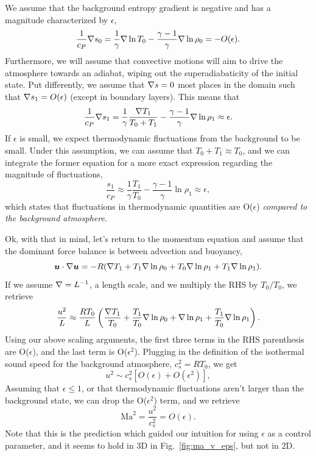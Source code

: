 We assume that the background entropy gradient is negative and has a magnitude characterized by $\epsilon$,
$$
\frac{1}{c_P}\nabla s_0 = \frac{1}{\gamma}\nabla\ln T_0 - \frac{\gamma - 1}{\gamma}\nabla \ln \rho_0 = -O(\epsilon).
$$
Furthermore, we will assume that convective motions will aim to drive the atmosphere towards an adiabat, wiping out the superadiabaticity of the initial state.
Put differently, we assume that $\nabla s = 0$ most places in the domain such that $\nabla s_1 = O(\epsilon)$ (except in boundary layers).
This means that
$$
\frac{1}{c_P}\nabla s_1 = \frac{1}{\gamma}\frac{\nabla T_1}{T_0 + T_1} - \frac{\gamma - 1}{\gamma}\nabla\ln\rho_1 \approx \epsilon.
$$
If $\epsilon$ is small, we expect thermodynamic fluctuations from the background to be small.
Under this assumption, we can assume that $T_0 + T_1 \approx T_0$, and we can integrate the former equation for a more exact expression regarding the magnitude of fluctuations,
\begin{equation}
\frac{s_1}{c_P} \approx \frac{1}{\gamma}\frac{T_1}{T_0} - \frac{\gamma-1}{\gamma}\ln\rho_1 \approx \epsilon,
\end{equation}
which states that fluctuations in thermodynamic quantities are O($\epsilon$) \emph{compared to the background atmosphere}.

Ok, with that in mind, let's return to the momentum equation and assume that the dominant force balance is between advection and buoyancy,
$$
\bm{u}\cdot\nabla\bm{u} = - R(\nabla T_1 + T_1 \nabla\ln\rho_0 + T_0 \nabla\ln\rho_1 + T_1 \nabla\ln\rho_1).
$$
If we assume $\nabla = L^{-1}$, a length scale, and we multiply the RHS by $T_0 / T_0$, we retrieve
$$
\frac{u^2}{L} \approx \frac{R T_0}{L}\left(\frac{\nabla T_1}{T_0} + \frac{T_1}{T_0}\nabla\ln\rho_0 + \nabla\ln\rho_1 + \frac{T_1}{T_0}\nabla\ln\rho_1 \right).
$$
Using our above scaling arguments, the first three terms in the RHS parenthesis are O($\epsilon$), and the last term is O($\epsilon^2$).
Plugging in the definition of the isothermal sound speed for the background atmosphere, $c_s^2 = R T_0$, we get
$$
u^2 \sim c_s^2 [ O(\epsilon) + O(\epsilon^2) ],
$$
Assuming that $\epsilon \leq 1$, or that thermodynamic fluctuations aren't larger than the background state, we can drop the O($\epsilon^2$) term, and we retrieve
$$
\text{Ma}^2 = \frac{u^2}{c_s^2} = O(\epsilon).
$$
Note that this is the prediction which guided our intuition for using $\epsilon$ as a control parameter, and it seems to hold in 3D in Fig.~\ref{fig:ma_v_eps}, but not in 2D.



